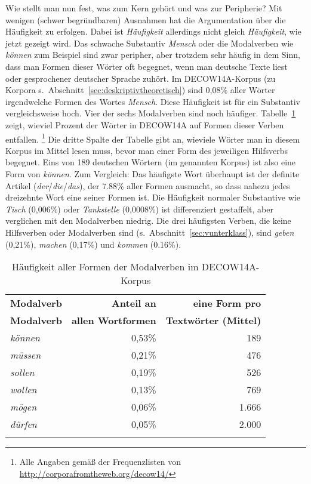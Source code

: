 Wie stellt man nun fest, was zum Kern gehört und was zur Peripherie?
Mit wenigen (schwer begründbaren) Ausnahmen hat die Argumentation über die Häufigkeit zu erfolgen.
Dabei ist \textit{Häufigkeit} allerdings nicht gleich \textit{Häufigkeit}, wie jetzt gezeigt wird.
Das schwache Substantiv \textit{Mensch} oder die Modalverben wie \textit{können} zum Beispiel sind zwar peripher, aber trotzdem sehr häufig in dem Sinn, dass man Formen dieser Wörter oft begegnet, wenn man deutsche Texte liest oder gesprochener deutscher Sprache zuhört.
Im DECOW14A-Korpus (zu Korpora s.\ Abschnitt~\ref{sec:deskriptivtheoretisch}) sind 0,08\% aller Wörter irgendwelche Formen des Wortes \textit{Mensch}.
Diese Häufigkeit ist für ein Substantiv vergleichsweise hoch. 
Vier der sechs Modalverben sind noch häufiger.
Tabelle~\ref{tab:modvfreq} zeigt, wieviel Prozent der Wörter in DECOW14A auf Formen dieser Verben entfallen.%
\footnote{Alle Angaben gemäß der Frequenzlisten von \url{http://corporafromtheweb.org/decow14/}}
Die dritte Spalte der Tabelle gibt an, wieviele Wörter man in diesem Korpus im Mittel lesen muss, bevor man einer Form des jeweiligen Hilfsverbs begegnet.
Eins von 189 deutschen Wörtern (im genannten Korpus) ist also eine Form von \textit{können}.
Zum Vergleich: Das häufigste Wort überhaupt ist der definite Artikel (\textit{der}\slash\textit{die}\slash\textit{das}), der 7.88\% aller Formen ausmacht, so dass nahezu jedes dreizehnte Wort eine seiner Formen ist.
Die Häufigkeit normaler Substantive wie \textit{Tisch} (0,006\%) oder \textit{Tankstelle} (0,0008\%) ist differenziert gestaffelt, aber verglichen mit den Modalverben niedrig.
Die drei häufigsten Verben, die keine Hilfsverben oder Modalverben sind (s.\ Abschnitt~\ref{sec:vunterklass}), sind \textit{geben} (0,21\%), \textit{machen} (0,17\%) und \textit{kommen} (0.16\%).

\begin{table}
	\begin{tabular}{lrr}
	  \lsptoprule
	  \textbf{Modalverb} & \textbf{Anteil an} & \textbf{eine Form pro}\\
	  \textbf{Modalverb} & \textbf{allen Wortformen} & \textbf{Textwörter (Mittel)}\\
	  \midrule
	  \textit{können} & 0,53\% &   189 \\
	  \textit{müssen} & 0,21\% &   476 \\
	  \textit{sollen} & 0,19\% &   526 \\
	  \textit{wollen} & 0,13\% &   769 \\
	  \textit{mögen}  & 0,06\% & 1.666\\
	  \textit{dürfen} & 0,05\% & 2.000\\
	  \lspbottomrule
	\end{tabular}
	\label{tab:modvfreq}
	\caption{Häufigkeit aller Formen der Modalverben im DECOW14A-Korpus}
\end{table}

